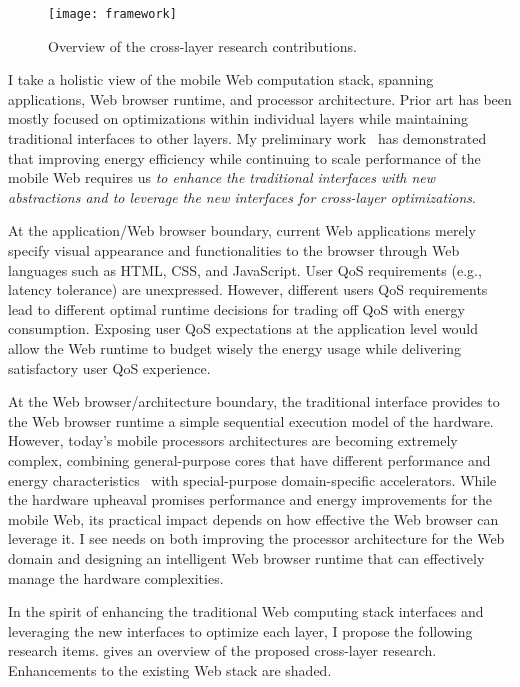 \begin{figure}[t]
  \centering
  \texttt{[image: framework]}
  \caption{\small{Overview of the cross-layer research contributions.}}
  \label{fig:framework}
\end{figure}

I take a holistic view of the mobile Web computation stack, spanning applications, Web browser runtime, and processor architecture. Prior art has been mostly focused on optimizations within individual layers while maintaining traditional interfaces to other layers. My preliminary work~\cite{big-little, zhu2014exploiting, zhu2015role, webcore, ebs, greenweb, mobilecpu, eve-char} has demonstrated that improving energy efficiency while continuing to scale performance of the mobile Web requires us \textit{to enhance the traditional interfaces with new abstractions and to leverage the new interfaces for cross-layer optimizations}.

At the application/Web browser boundary, current Web applications merely specify visual appearance and functionalities to the browser through Web languages such as HTML, CSS, and JavaScript. User QoS requirements (e.g., latency tolerance) are unexpressed. However, different users QoS requirements lead to different optimal runtime decisions for trading off QoS with energy consumption. Exposing user QoS expectations at the application level would allow the Web runtime to budget wisely the energy usage while delivering satisfactory user QoS experience.

At the Web browser/architecture boundary, the traditional interface provides to the Web browser runtime a simple sequential execution model of the hardware.  However, today's mobile processors architectures are becoming extremely complex, combining general-purpose cores that have different performance and energy characteristics~\cite{single-ISA} with special-purpose domain-specific accelerators. While the hardware upheaval promises performance and energy improvements for the mobile Web, its practical impact depends on how effective the Web browser can leverage it. I see needs on both improving the processor architecture for the Web domain and designing an intelligent Web browser runtime that can effectively manage the hardware complexities.

In the spirit of enhancing the traditional Web computing stack interfaces and leveraging the new interfaces to optimize each layer, I propose the following research items.  gives an overview of the proposed cross-layer research. Enhancements to the existing Web stack are shaded.

